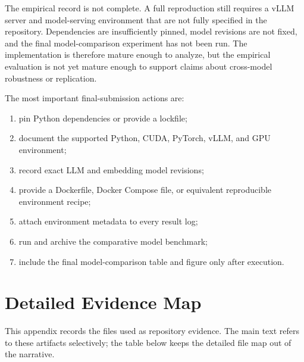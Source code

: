 \documentclass[11pt,a4paper]{article}
\begin{document}
The empirical record is not complete. A full reproduction still requires a vLLM server and model-serving environment that are not fully specified in the repository. Dependencies are insufficiently pinned, model revisions are not fixed, and the final model-comparison experiment has not been run. The implementation is therefore mature enough to analyze, but the empirical evaluation is not yet mature enough to support claims about cross-model robustness or replication.

The most important final-submission actions are:

\begin{enumerate}
  \item pin Python dependencies or provide a lockfile;
  \item document the supported Python, CUDA, PyTorch, vLLM, and GPU environment;
  \item record exact LLM and embedding model revisions;
  \item provide a Dockerfile, Docker Compose file, or equivalent reproducible environment recipe;
  \item attach environment metadata to every result log;
  \item run and archive the comparative model benchmark;
  \item include the final model-comparison table and figure only after execution.
\end{enumerate}

\appendix
\newpage
\section{Detailed Evidence Map}
\label{app:evidence}

This appendix records the files used as repository evidence. The main text refers to these artifacts selectively; the table below keeps the detailed file map out of the narrative.
\end{document}

